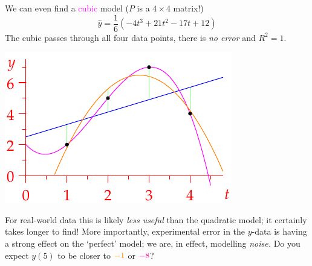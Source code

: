 \begin{example}{}{}
\begin{enumerate}
\begin{minipage}[t]{0.58\linewidth}
	\item We can even find a \textcolor{magenta}{cubic} model ($P$ is a $4\times 4$ matrix!)
	\[\hat y=\frac 1{6}(-4t^3+21t^2-17t+12)\]
	The cubic passes through all four data points,
	there is \emph{no error} and $R^2=1$.
	\end{minipage}
	\hfill
	\begin{minipage}[t]{0.4\linewidth}\vspace{-12pt}
		\flushright\includegraphics[scale=1]{reg-quad1}
	\end{minipage}
	\smallbreak
	For real-world data this is likely \emph{less useful} than the quadratic model; it certainly takes longer to find! More importantly, experimental error in the $y$-data is having a strong effect on the `perfect' model; we are, in effect, modelling \emph{noise.} Do you expect $y(5)$ to be closer to $\textcolor{orange}{-1}$ or $\textcolor{magenta}{-8}$?
\end{enumerate}
\end{example}

\goodbreak


% 

